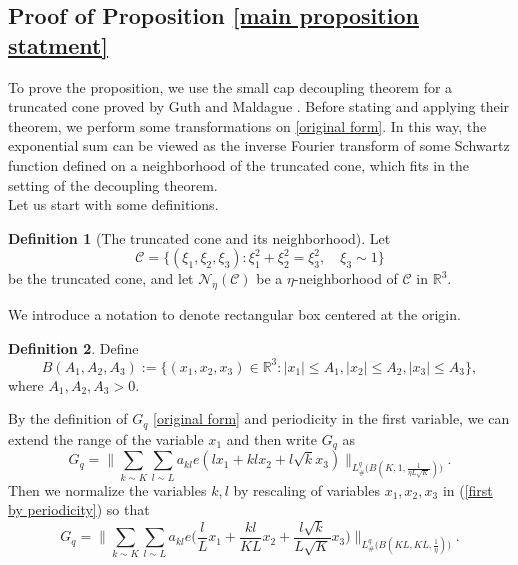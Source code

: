 \documentclass[11pt]{amsart}
\numberwithin{equation}{section}
\theoremstyle{definition}
\newtheorem{definition}{Definition}[section]
\theoremstyle{proposition}
\begin{document}
\subsection{Proof of Proposition \ref{main proposition statment}}

To prove the proposition, we use the small cap decoupling theorem for a truncated cone proved by Guth and Maldague \cite{GuthMaldague}. Before stating and applying their theorem, we perform some transformations on \eqref{original form}. In this way, the exponential sum can be viewed as the inverse Fourier transform of some Schwartz function defined on a neighborhood of the truncated cone, which fits in the setting of the decoupling theorem.  \\

Let us  start with some definitions.
\begin{definition}[The truncated cone and its neighborhood]  \label{truncated cone}
Let
\begin{equation}   \label{cone definition}
\mathcal{C}=\{(\xi_1,\xi_2,\xi_3):\xi_1^2+\xi_2^2=\xi_3^2, \quad \xi_3\sim 1\}    
\end{equation} 
be the truncated cone, and let $\mathcal{N}_\eta(\mathcal{C})$ be a $\eta$-neighborhood of $\mathcal{C}$ in $\mathbb R^3$.
\end{definition}

We introduce a notation to denote rectangular box centered at the origin. 

\begin{definition} \label{box centered at origin} Define
\[
B(A_1,A_2,A_3) :=\{(x_1,x_2,x_3)\in \mathbb R^3: |x_1|\le A_1,|x_2|\le A_2, |x_3|\le A_3\},
\]    
where $A_1, A_2, A_3>0$.
\end{definition}

By the definition of $G_q$ \eqref{original form} and  periodicity in the first variable, we can extend the range of the variable $x_1$ and then write $G_q$ as 
\begin{equation}  \label{first by periodicity}
G_q=\Big\|\sum_{k\sim K}\sum_{l\sim L} a_{kl}e(lx_1+klx_2+l\sqrt{k}x_3)\Big\|_{L^q_{\#}\Big(B(K,1,\frac{1}{\eta L\sqrt{K}})\Big)}.    
\end{equation}
Then we normalize the variables $k,l$ by rescaling of variables $x_1,x_2,x_3$ in  (\ref{first by periodicity}) so that  
\begin{equation}  \label{variance 1}
G_q=\Big\|\sum_{k\sim K}\sum_{l\sim L} a_{kl} e\Big(\frac{l}{L}x_1+\frac{kl}{KL}x_2+\frac{l\sqrt{k}}{L\sqrt{K}}x_3 \Big)\Big\|_{L^q_{\#}\Big(B(KL,KL,\frac{1}{\eta})\Big)}.
\end{equation}
\end{document}
